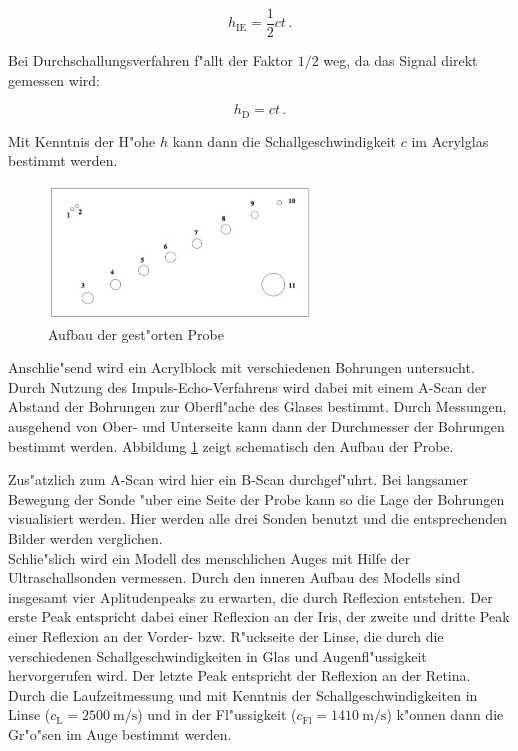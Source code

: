 	\begin{equation}
		h_\mathrm{IE} = \frac{1}{2}c t \,. \label{s1}
	\end{equation}

	Bei Durchschallungsverfahren f"allt der Faktor $1/2$ weg, da das Signal direkt gemessen wird:

	\begin{equation}
		h_\mathrm{D} = c t \,.
	\end{equation}

	Mit Kenntnis der H"ohe $h$ kann dann die Schallgeschwindigkeit $c$ im Acrylglas bestimmt werden. \\

	\begin{figure}
		\centering
		\includegraphics[width = 7cm]{img/klotz.jpeg}
		\caption{Aufbau der gest"orten Probe \label{fig:klotz}}
	\end{figure}

	Anschlie"send wird ein Acrylblock mit verschiedenen Bohrungen untersucht.
	Durch Nutzung des Impuls-Echo-Verfahrens wird dabei mit einem A-Scan der Abstand der Bohrungen zur Oberfl"ache des Glases bestimmt.
	Durch Messungen, ausgehend von Ober- und Unterseite kann dann der Durchmesser der Bohrungen bestimmt werden.
	Abbildung \ref{fig:klotz} zeigt schematisch den Aufbau der Probe.

	Zus"atzlich zum A-Scan wird hier ein B-Scan durchgef"uhrt.
	Bei langsamer Bewegung der Sonde "uber eine Seite der Probe kann so die Lage der Bohrungen visualisiert werden.
	Hier werden alle drei Sonden benutzt und die entsprechenden Bilder werden verglichen. \\

	Schlie"slich wird ein Modell des menschlichen Auges mit Hilfe der Ultraschallsonden vermessen.
	Durch den inneren Aufbau des Modells sind insgesamt vier Aplitudenpeaks zu erwarten, die durch Reflexion entstehen.
	Der erste Peak entspricht dabei einer Reflexion an der Iris, der zweite und dritte Peak einer Reflexion an der Vorder- bzw. R"uckseite der Linse, die durch die verschiedenen Schallgeschwindigkeiten in Glas und Augenfl"ussigkeit hervorgerufen wird.
	Der letzte Peak entspricht der Reflexion an der Retina.
	Durch die Laufzeitmessung und mit Kenntnis der Schallgeschwindigkeiten in Linse ($c_\mathrm{L} = \SI{2500}{\meter \per \second}$) und in der Fl"ussigkeit ($c_\mathrm{Fl} = \SI{1410}{\meter \per \second}$) k"onnen dann die Gr"o"sen im Auge bestimmt werden.